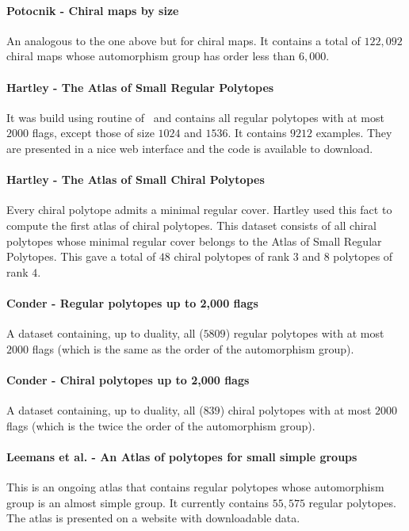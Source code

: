 \paragraph{Potocnik - Chiral maps by size} An analogous to the one above but for chiral maps. It contains a total of $122,092$ chiral maps whose automorphism group has order less than $6,000$.

\paragraph{Hartley - The Atlas of Small Regular Polytopes } It was build using \smallgrp routine of \gap\ and contains all regular polytopes with at most $2000$ flags, except those of size $1024$ and $1536$. It contains $9212$ examples. They are presented in a nice web interface and the code is available to download.

\paragraph{Hartley - The Atlas of Small Chiral Polytopes} Every chiral polytope admits a minimal regular cover. Hartley used this fact to compute the first atlas of chiral polytopes. This dataset consists of all chiral polytopes whose minimal regular cover belongs to the Atlas of Small Regular Polytopes. This gave a total of $48$ chiral polytopes of rank $3$ and $8$ polytopes of rank $4$.

\paragraph{Conder - Regular polytopes up to 2,000 flags} A dataset containing, up to duality, all ($5809$) regular polytopes with at most $2000$ flags (which is the same as the order of the automorphism group).

\paragraph{Conder - Chiral polytopes up to 2,000 flags} A dataset containing, up to duality, all ($839$) chiral polytopes with at most $2000$ flags (which is the twice the order  of the automorphism group).


\paragraph{Leemans et al. - An Atlas of polytopes for small simple groups} This is an ongoing atlas that contains regular polytopes whose automorphism group is an almost simple group. It currently contains $55,575$ regular polytopes. The atlas is presented on a website with downloadable data.

